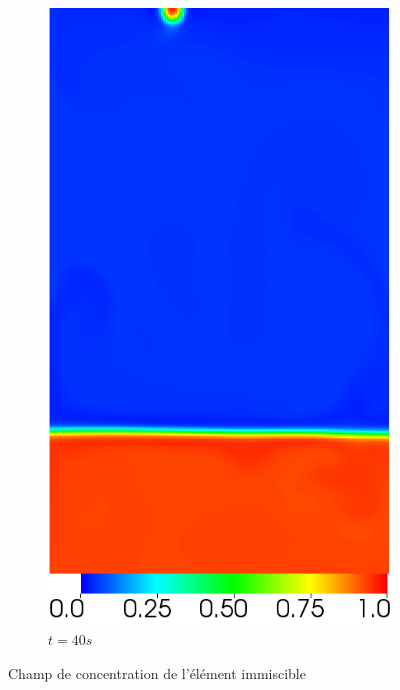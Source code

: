 \begin{figure}[H]
\begin{subfigure}[ht!]{0.2\textwidth}
		\includegraphics[width=1\textwidth]{figure/PT_RT/concent1/visit0006.png}
		\caption{$t=40s$}
	\end{subfigure}
	\caption{Champ de concentration de l'élément immiscible}
	\label{fig:rt1}
\end{figure}



